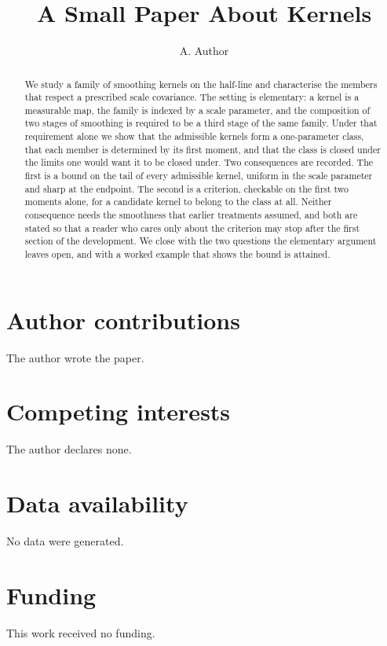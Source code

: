 \documentclass[11pt]{article}
\title{A Small Paper About Kernels}
\author{A. Author}
\begin{document}
\maketitle

\begin{abstract}
We study a family of smoothing kernels on the half-line and characterise the members
that respect a prescribed scale covariance. The setting is elementary: a kernel is a
measurable map, the family is indexed by a scale parameter, and the composition of two
stages of smoothing is required to be a third stage of the same family. Under that
requirement alone we show that the admissible kernels form a one-parameter class, that
each member is determined by its first moment, and that the class is closed under the
limits one would want it to be closed under. Two consequences are recorded. The first
is a bound on the tail of every admissible kernel, uniform in the scale parameter and
sharp at the endpoint. The second is a criterion, checkable on the first two moments
alone, for a candidate kernel to belong to the class at all. Neither consequence needs
the smoothness that earlier treatments assumed, and both are stated so that a reader who
cares only about the criterion may stop after the first section of the development. We
close with the two questions the elementary argument leaves open, and with a worked
example that shows the bound is attained.
\end{abstract}



\section*{Author contributions}
The author wrote the paper.

\section*{Competing interests}
The author declares none.

\section*{Data availability}
No data were generated.

\section*{Funding}
This work received no funding.



\end{document}
